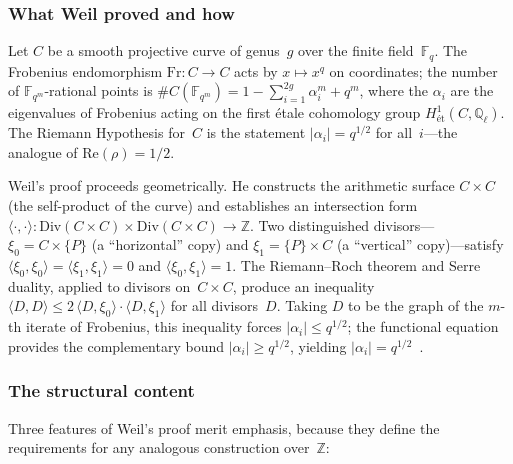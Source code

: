 \subsubsection{What Weil proved and how}

Let $C$ be a smooth projective curve of genus~$g$ over the finite
field~$\mathbb{F}_q$.  The Frobenius endomorphism
$\mathrm{Fr}\colon C \to C$ acts by $x \mapsto x^q$ on coordinates;
the number of $\mathbb{F}_{q^m}$-rational points is
$\#C(\mathbb{F}_{q^m}) = 1 - \sum_{i=1}^{2g}\alpha_i^m + q^m$,
where the $\alpha_i$ are the eigenvalues of Frobenius acting on
the first \'etale cohomology group $H^1_{\text{\'et}}(C, \mathbb{Q}_\ell)$.
The Riemann Hypothesis for~$C$ is the statement
$|\alpha_i| = q^{1/2}$ for all~$i$---the analogue of
$\mathrm{Re}(\rho) = 1/2$.

Weil's proof proceeds geometrically.  He constructs the arithmetic
surface $C \times C$ (the self-product of the curve) and establishes
an intersection form
$\langle\cdot,\cdot\rangle\colon \mathrm{Div}(C \times C) \times
\mathrm{Div}(C \times C) \to \mathbb{Z}$.
Two distinguished divisors---$\xi_0 = C \times \{P\}$ (a
``horizontal'' copy) and $\xi_1 = \{P\} \times C$ (a ``vertical''
copy)---satisfy $\langle\xi_0,\xi_0\rangle = \langle\xi_1,\xi_1\rangle = 0$
and $\langle\xi_0,\xi_1\rangle = 1$.
The Riemann--Roch theorem and Serre duality, applied to divisors
on~$C \times C$, produce an inequality
$\langle D, D\rangle \leq 2\,\langle D,\xi_0\rangle \cdot
\langle D,\xi_1\rangle$
for all divisors~$D$.  Taking $D$ to be the graph of the $m$-th
iterate of Frobenius, this inequality forces
$|\alpha_i| \leq q^{1/2}$; the functional equation provides the
complementary bound $|\alpha_i| \geq q^{1/2}$, yielding
$|\alpha_i| = q^{1/2}$~\cite{oort14,milne15}.

\subsubsection{The structural content}

Three features of Weil's proof merit emphasis, because they define
the requirements for any analogous construction over~$\mathbb{Z}$:


